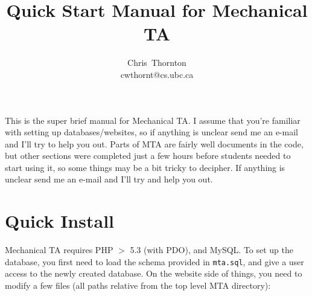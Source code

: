 \documentclass[11pt,letterpaper,oneside]{article}
\begin{document}
\title{Quick Start Manual for Mechanical TA}

\author{
Chris~Thornton\\
cwthornt@cs.ubc.ca
}

\maketitle

\tableofcontents

This is the super brief manual for Mechanical TA. I assume that you're familiar with setting up databases/websites, so if anything is unclear send me an e-mail and I'll try to help you out. Parts of MTA are fairly well documents in the code, but other sections were completed just a few hours before students needed to start using it, so some things may be a bit tricky to decipher. If anything is unclear send me an e-mail and I'll try and help you out.

\section{Quick Install}

Mechanical TA requires PHP $>$ 5.3 (with PDO), and MySQL. To set up the database, you first need to load the schema provided in \texttt{mta.sql}, and give a user access to the newly created database. On the website side of things, you need to modify a few files (all paths relative from the top level MTA directory):
\end{document}
